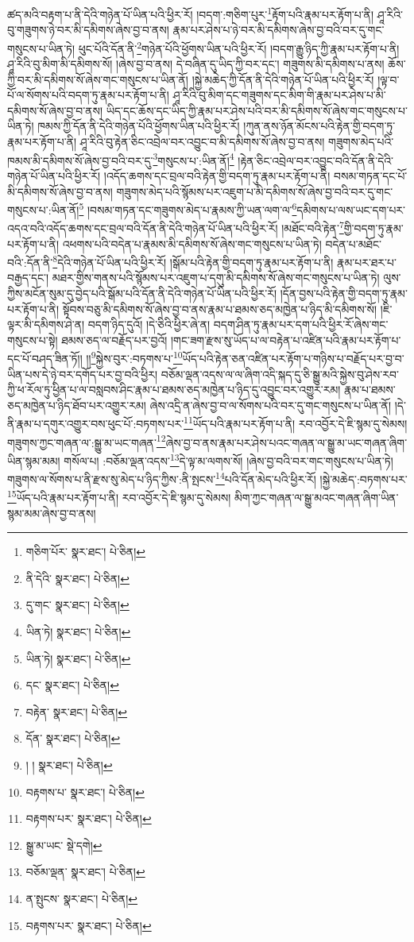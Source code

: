 ཚད་མའི་བརྟག་པ་ནི་དེའི་གཉེན་པོ་ཡིན་པའི་ཕྱིར་རོ། །བདག་:གཅིག་པུར་\footnote{གཅིག་པོར་  སྣར་ཐང་།  པེ་ཅིན། }རྟོག་པའི་རྣམ་པར་རྟོག་པ་ནི། ཤཱ་རིའི་བུ་གཟུགས་ཉེ་བར་མི་དམིགས་ཞེས་བྱ་བ་ནས། རྣམ་པར་ཤེས་པ་ཉེ་བར་མི་དམིགས་ཞེས་བྱ་བའི་བར་དུ་གང་གསུངས་པ་ཡིན་ཏེ། ཕུང་པོའི་དོན་ནི་\footnote{ནི་དེའི་  སྣར་ཐང་།  པེ་ཅིན། }གཉེན་པོའི་ཕྱོགས་ཡིན་པའི་ཕྱིར་རོ། །བདག་རྒྱུ་ཉིད་ཀྱི་རྣམ་པར་རྟོག་པ་ནི། ཤཱ་རིའི་བུ་མིག་མི་དམིགས་སོ། །ཞེས་བྱ་བ་ནས། དེ་བཞིན་དུ་ཡིད་ཀྱི་བར་དང་། གཟུགས་མི་དམིགས་པ་ནས། ཆོས་ཀྱི་བར་མི་དམིགས་སོ་ཞེས་གང་གསུངས་པ་ཡིན་ནོ། །སྐྱེ་མཆེད་ཀྱི་དོན་ནི་དེའི་གཉེན་པོ་ཡིན་པའི་ཕྱིར་རོ། །ལྟ་བ་པོ་ལ་སོགས་པའི་བདག་ཏུ་རྣམ་པར་རྟོག་པ་ནི། ཤཱ་རིའི་བུ་མིག་དང་གཟུགས་དང་མིག་གི་རྣམ་པར་ཤེས་པ་མི་དམིགས་སོ་ཞེས་བྱ་བ་ནས། ཡིད་དང་ཆོས་དང་ཡིད་ཀྱི་རྣམ་པར་ཤེས་པའི་བར་མི་དམིགས་སོ་ཞེས་གང་གསུངས་པ་ཡིན་ཏེ། ཁམས་ཀྱི་དོན་ནི་དེའི་གཉེན་པོའི་ཕྱོགས་ཡིན་པའི་ཕྱིར་རོ། །ཀུན་ནས་ཉོན་མོངས་པའི་རྟེན་གྱི་བདག་ཏུ་རྣམ་པར་རྟོག་པ་ནི། ཤཱ་རིའི་བུ་རྟེན་ཅིང་འབྲེལ་བར་འབྱུང་བ་མི་དམིགས་སོ་ཞེས་བྱ་བ་ནས། གཟུགས་མེད་པའི་ཁམས་མི་དམིགས་སོ་ཞེས་བྱ་བའི་བར་དུ་\footnote{དུ་གང་  སྣར་ཐང་།  པེ་ཅིན། }གསུངས་པ་:ཡིན་ནོ།\footnote{ཡིན་ཏེ།  སྣར་ཐང་།  པེ་ཅིན། } །རྟེན་ཅིང་འབྲེལ་བར་འབྱུང་བའི་དོན་ནི་དེའི་གཉེན་པོ་ཡིན་པའི་ཕྱིར་རོ། །འདོད་ཆགས་དང་བྲལ་བའི་རྟེན་གྱི་བདག་ཏུ་རྣམ་པར་རྟོག་པ་ནི། བསམ་གཏན་དང་པོ་མི་དམིགས་སོ་ཞེས་བྱ་བ་ནས། གཟུགས་མེད་པའི་སྙོམས་པར་འཇུག་པ་མི་དམིགས་སོ་ཞེས་བྱ་བའི་བར་དུ་གང་གསུངས་པ་:ཡིན་ནོ།\footnote{ཡིན་ཏེ།  སྣར་ཐང་།  པེ་ཅིན། } །བསམ་གཏན་དང་གཟུགས་མེད་པ་རྣམས་ཀྱི་ཡན་ལག་ལ་\footnote{དང་  སྣར་ཐང་།  པེ་ཅིན། }དམིགས་པ་ལས་ཡང་དག་པར་འདའ་བའི་འདོད་ཆགས་དང་བྲལ་བའི་དོན་ནི་དེའི་གཉེན་པོ་ཡིན་པའི་ཕྱིར་རོ། །མཐོང་བའི་རྟེན་\footnote{བརྟེན་  སྣར་ཐང་།  པེ་ཅིན། }གྱི་བདག་ཏུ་རྣམ་པར་རྟོག་པ་ནི། འཕགས་པའི་བདེན་པ་རྣམས་མི་དམིགས་སོ་ཞེས་གང་གསུངས་པ་ཡིན་ཏེ། བདེན་པ་མཐོང་བའི་:དོན་ནི་\footnote{དོན་  སྣར་ཐང་།  པེ་ཅིན། }དེའི་གཉེན་པོ་ཡིན་པའི་ཕྱིར་རོ། །སྒོམ་པའི་རྟེན་གྱི་བདག་ཏུ་རྣམ་པར་རྟོག་པ་ནི། རྣམ་པར་ཐར་པ་བརྒྱད་དང་། མཐར་གྱིས་གནས་པའི་སྙོམས་པར་འཇུག་པ་དགུ་མི་དམིགས་སོ་ཞེས་གང་གསུངས་པ་ཡིན་ཏེ། ལུས་ཀྱིས་མངོན་སུམ་དུ་བྱེད་པའི་སྒོམ་པའི་དོན་ནི་དེའི་གཉེན་པོ་ཡིན་པའི་ཕྱིར་རོ། །དོན་བྱས་པའི་རྟེན་གྱི་བདག་ཏུ་རྣམ་པར་རྟོག་པ་ནི། སྟོབས་བཅུ་མི་དམིགས་སོ་ཞེས་བྱ་བ་ནས་རྣམ་པ་ཐམས་ཅད་མཁྱེན་པ་ཉིད་མི་དམིགས་སོ། །ཇི་ལྟར་མི་དམིགས་ཤེ་ན། བདག་ཉིད་དུའོ། །དེ་ཅིའི་ཕྱིར་ཞེ་ན། བདག་ཤིན་ཏུ་རྣམ་པར་དག་པའི་ཕྱིར་རོ་ཞེས་གང་གསུངས་པ་སྟེ། ཐམས་ཅད་ལ་བརྗོད་པར་བྱའོ། །གང་ཟག་རྫས་སུ་ཡོད་པ་ལ་བརྟེན་པ་འཛིན་པའི་རྣམ་པར་རྟོག་པ་དང་པོ་བཤད་ཟིན་ཏོ།། །།\footnote{། །  སྣར་ཐང་།  པེ་ཅིན། }སྐྱེས་བུར་:བཏགས་པ་\footnote{བརྟགས་པ་  སྣར་ཐང་།  པེ་ཅིན། }ཡོད་པའི་རྟེན་ཅན་འཛིན་པར་རྟོག་པ་གཉིས་པ་བརྗོད་པར་བྱ་བ་ཡིན་པས་དེ་ཉེ་བར་དགོད་པར་བྱ་བའི་ཕྱིར། བཅོམ་ལྡན་འདས་ལ་ལ་ཞིག་འདི་སྐད་དུ་ཅི་སྒྱུ་མའི་སྐྱེས་བུ་ཤེས་རབ་ཀྱི་ཕ་རོལ་ཏུ་ཕྱིན་པ་ལ་བསླབས་ཤིང་རྣམ་པ་ཐམས་ཅད་མཁྱེན་པ་ཉིད་དུ་འབྱུང་བར་འགྱུར་རམ། རྣམ་པ་ཐམས་ཅད་མཁྱེན་པ་ཉིད་ཐོབ་པར་འགྱུར་རམ། ཞེས་འདྲི་ན་ཞེས་བྱ་བ་ལ་སོགས་པའི་བར་དུ་གང་གསུངས་པ་ཡིན་ནོ། །དེ་ནི་རྣམ་པ་དགུར་འགྱུར་བས་ཕུང་པོ་:བཏགས་པར་\footnote{བརྟགས་པར་  སྣར་ཐང་།  པེ་ཅིན། }ཡོད་པའི་རྣམ་པར་རྟོག་པ་ནི། རབ་འབྱོར་དེ་ཇི་སྙམ་དུ་སེམས། གཟུགས་ཀྱང་གཞན་ལ་:སྒྱུ་མ་ཡང་གཞན་\footnote{སྒྱུ་མ་ཡང་  སྡེ་དགེ། }ཞེས་བྱ་བ་ནས་རྣམ་པར་ཤེས་པའང་གཞན་ལ་སྒྱུ་མ་ཡང་གཞན་ཞིག་ཡིན་སྙམ་མམ། གསོལ་པ། :བཅོམ་ལྡན་འདས་\footnote{བཅོམ་ལྡན་  སྣར་ཐང་།  པེ་ཅིན། }དེ་ལྟ་མ་ལགས་སོ། །ཞེས་བྱ་བའི་བར་གང་གསུངས་པ་ཡིན་ཏེ། གཟུགས་ལ་སོགས་པ་ནི་རྫས་སུ་མེད་པ་ཉིད་ཀྱིས་:ནི་སྤངས་\footnote{ན་སྤུངས་  སྣར་ཐང་།  པེ་ཅིན། }པའི་དོན་མེད་པའི་ཕྱིར་རོ། །སྐྱེ་མཆེད་:བཏགས་པར་\footnote{བརྟགས་པར་  སྣར་ཐང་།  པེ་ཅིན། }ཡོད་པའི་རྣམ་པར་རྟོག་པ་ནི། རབ་འབྱོར་དེ་ཇི་སྙམ་དུ་སེམས། མིག་ཀྱང་གཞན་ལ་སྒྱུ་མའང་གཞན་ཞིག་ཡིན་སྙམ་མམ་ཞེས་བྱ་བ་ནས། 